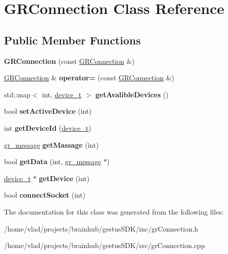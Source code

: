 \hypertarget{classGRConnection}{}\section{G\+R\+Connection Class Reference}
\label{classGRConnection}
\subsection*{Public Member Functions}
\begin{DoxyCompactItemize}
\item 
\mbox{\label{classGRConnection_a6ed68a1cdf75f13104f4177124da552e}} 
{\bfseries G\+R\+Connection} (const \mbox{\hyperlink{classGRConnection}{G\+R\+Connection}} \&)
\item 
\mbox{\label{classGRConnection_a6ff6ab57a748653da2f1f34f3dbbf8ff}} 
\mbox{\hyperlink{classGRConnection}{G\+R\+Connection}} \& {\bfseries operator=} (const \mbox{\hyperlink{classGRConnection}{G\+R\+Connection}} \&)
\item 
\mbox{\label{classGRConnection_aa5d61eeb78fdc791f1c2f72c758cd7b4}} 
std\+::map$<$ int, \mbox{\hyperlink{structdevice__t}{device\+\_\+t}} $>$ {\bfseries get\+Avalible\+Devices} ()
\item 
\mbox{\label{classGRConnection_a3a64dcc39afe096f83f3c6a6476359f3}} 
bool {\bfseries set\+Active\+Device} (int)
\item 
\mbox{\label{classGRConnection_a2cafff531babf3c0e11f1b37a2e0a35c}} 
int {\bfseries get\+Device\+Id} (\mbox{\hyperlink{structdevice__t}{device\+\_\+t}})
\item 
\mbox{\label{classGRConnection_a6dbdd7852ad0c77990ef6c7c0888f3b9}} 
\mbox{\hyperlink{structgr__message}{gr\+\_\+message}} {\bfseries get\+Massage} (int)
\item 
\mbox{\label{classGRConnection_af28a5f24a229c9f85e2a2da8c98f14b8}} 
bool {\bfseries get\+Data} (int, \mbox{\hyperlink{structgr__message}{gr\+\_\+message}} $\ast$)
\item 
\mbox{\label{classGRConnection_ac6f1269b99dd8485e2f864073a0b6307}} 
\mbox{\hyperlink{structdevice__t}{device\+\_\+t}} $\ast$ {\bfseries get\+Device} (int)
\item 
\mbox{\label{classGRConnection_aad1335f966c22c9c12538707ed94649a}} 
bool {\bfseries connect\+Socket} (int)
\end{DoxyCompactItemize}


The documentation for this class was generated from the following files\+:\begin{DoxyCompactItemize}
\item 
/home/vlad/projects/brainhub/gestus\+S\+D\+K/inc/gr\+Connection.\+h\item 
/home/vlad/projects/brainhub/gestus\+S\+D\+K/src/gr\+Connection.\+cpp\end{DoxyCompactItemize}
